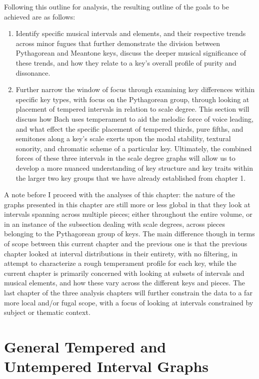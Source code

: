 Following this outline for analysis, the resulting outline of the goals
to be achieved are as follows:

\begin{enumerate}
\def\labelenumi{\arabic{enumi}.}
\tightlist
\item
  Identify specific musical intervals and elements, and their respective
  trends across minor fugues that further demonstrate the division
  between Pythagorean and Meantone keys, discuss the deeper musical
  significance of these trends, and how they relate to a key's overall
  profile of purity and dissonance.
\item
  Further narrow the window of focus through examining key differences
  within specific key types, with focus on the Pythagorean group,
  through looking at placement of tempered intervals in relation to
  scale degree. This section will discuss how Bach uses temperament to
  aid the melodic force of voice leading, and what effect the specific
  placement of tempered thirds, pure fifths, and semitones along a key's
  scale exerts upon the modal stability, textural sonority, and
  chromatic scheme of a particular key. Ultimately, the combined forces
  of these three intervals in the scale degree graphs will allow us to
  develop a more nuanced understanding of key structure and key traits
  within the larger two key groups that we have already established from
  chapter 1.
\end{enumerate}

A note before I proceed with the analyses of this chapter: the nature of
the graphs presented in this chapter are still more or less global in
that they look at intervals spanning across multiple pieces; either
throughout the entire volume, or in an instance of the subsection
dealing with scale degrees, across pieces belonging to the Pythagorean
group of keys. The main difference though in terms of scope between this
current chapter and the previous one is that the previous chapter looked
at interval distributions in their entirety, with no filtering, in
attempt to characterize a rough temperament profile for each key, while
the current chapter is primarily concerned with looking at subsets of
intervals and musical elements, and how these vary across the different
keys and pieces. The last chapter of the three analysis chapters will
further constrain the data to a far more local and/or fugal scope, with
a focus of looking at intervals constrained by subject or thematic
context.

    \section{General Tempered and Untempered Interval
Graphs}\label{general-tempered-and-untempered-interval-graphs}

